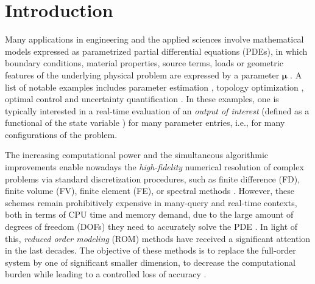 \documentclass[longtitle]{elsarticle}
\numberwithin{equation}{section}
\theoremstyle{theorem}
\theoremstyle{definition}
\theoremstyle{remark}
\theoremstyle{proposition}
\numberwithin{figure}{section}
\newcommand{\bg}[1]{\boldsymbol{#1}}
\begin{document}
	

	\section{Introduction}
	\label{section:Introduction}
		
		Many applications in engineering and the applied sciences involve mathematical models expressed as parametrized partial differential equations (PDEs), in which boundary conditions, material properties, source terms, loads or geometric features of the underlying physical problem are expressed by a parameter $\bg{\mu}$ \cite{Eft08, HSR16, JIR14}. A list of notable examples includes parameter estimation \cite{Bro93}, topology optimization \cite{Ben04}, optimal control \cite{LM67} and uncertainty quantification \cite{LeM10}. In these examples, one is typically interested in a real-time evaluation of an \emph{output of interest} (defined as a functional of the state variable \cite{Dep08}) for many parameter entries, i.e., for many configurations of the problem.  
		
		The increasing computational power and the simultaneous algorithmic improvements enable nowadays the \emph{high-fidelity} numerical resolution of complex problems via standard discretization procedures, such as finite difference (FD), finite volume (FV), finite element (FE), or spectral methods \cite{QMN15}. However, these schemes remain prohibitively expensive in many-query and real-time contexts, both in terms of CPU time and memory demand, due to the large amount of degrees of freedom (DOFs) they need to accurately solve the PDE \cite{Ams10}. In light of this, \emph{reduced order modeling} (ROM) methods have received a significant attention in the last decades. The objective of these methods is to replace the full-order system by one of significant smaller dimension, to decrease the computational burden while leading to a controlled loss of accuracy \cite{Chen17}. 
		
\end{document}
